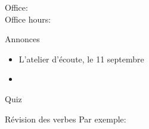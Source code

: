 \documentclass{beamer}
\subtitle[Activités]{Les activités, les verbes \lexi{-er} et la négation}
\begin{document}
  \begin{frame}
    \titlepage
    \tiny{Office: \\
          Office hours: }
  \end{frame}

  \begin{frame}{Annonces}
    \begin{itemize}
      \item L'atelier d'écoute, le 11 septembre
      \item[] 
    \end{itemize}
  \end{frame}

  \begin{frame}{}
    \begin{center}
      \Large Quiz
    \end{center}
  \end{frame}

  \begin{frame}{Révision des verbes }
    Par exemple:
    \begin{center}
      
    \end{center}
  \end{frame}
\end{document}

